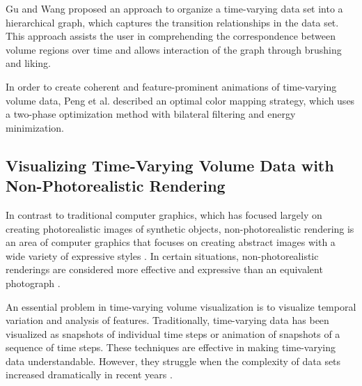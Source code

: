 Gu and Wang \cite{gu_transgraph:_2011} proposed an approach to organize a time-varying data set into a hierarchical graph, which captures the transition relationships in the data set. This approach assists the user in comprehending the correspondence between volume regions over time and allows interaction of the graph through brushing and liking.

In order to create coherent and feature-prominent animations of time-varying volume data, Peng et al. \cite{peng_optimal_2011} described an optimal color mapping strategy, which uses a two-phase optimization method with bilateral filtering and energy minimization.

\subsection{Visualizing Time-Varying Volume Data with Non-Photorealistic Rendering}
In contrast to traditional computer graphics, which has focused largely on creating photorealistic images of synthetic objects, non-photorealistic rendering is an area of computer graphics that focuses on creating abstract images with a wide variety of expressive styles \cite{haeberli_paint_1990}.
In certain situations, non-photorealistic renderings are considered more effective and expressive than an equivalent photograph \cite{healey_perceptually_2004}.

An essential problem in time-varying volume visualization is to visualize temporal variation and analysis of features. Traditionally, time-varying data has been visualized as snapshots of individual time steps or animation of snapshots of a sequence of time steps. These techniques are effective in making time-varying data understandable. However, they struggle when the complexity of data sets increased dramatically in recent years \cite{brambilla_illustrative_2012}.

